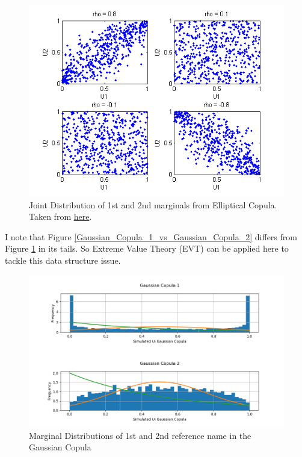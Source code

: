 \documentclass{report}
\theoremstyle{plain}
\theoremstyle{definition}
\begin{document}
\begin{figure}[H]
	\begin{center}
		\includegraphics[width=15cm]{copulademo_08.png}
		\caption{Joint Distribution of 1st and 2nd marginals from Elliptical Copula. \newline Taken from \href{http://www.mbfys.ru.nl/~robvdw/CNP04/LAB_ASSIGMENTS/LAB05_CN05/MATLAB2007b/stats/html/copulademo.html}{here}.} 
		\label{copulademo_08}
	\end{center}
\end{figure}

I note that Figure \ref{Gaussian_Copula_1_vs_Gaussian_Copula_2} differs from Figure \ref{copulademo_08} in its tails. So Extreme Value Theory (EVT) can be applied here to tackle this data structure issue.

\begin{figure}[H]
	\begin{center}
		\includegraphics[width=15cm]{Gaussian_Copula_1.png}
		\caption{Marginal Distributions of 1st and 2nd reference name in the Gaussian Copula} 
		\label{Gaussian_Copula_1}
	\end{center}
\end{figure}
\end{document}
